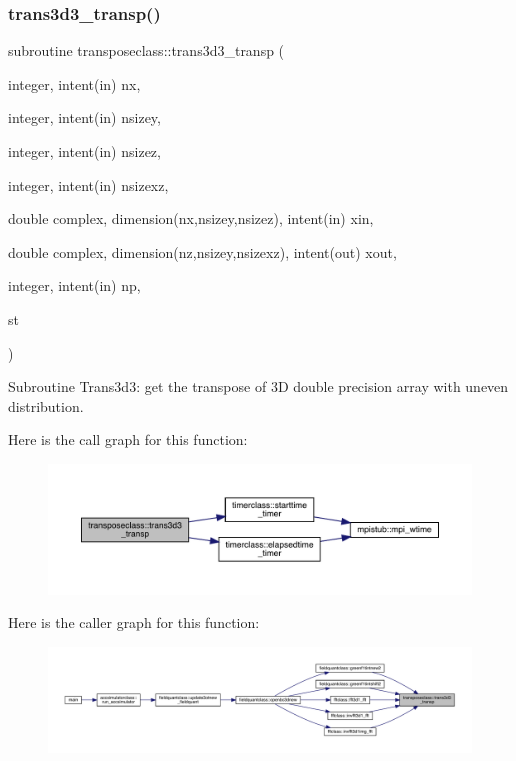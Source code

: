\subsubsection{\texorpdfstring{trans3d3\_transp()}{trans3d3\_transp()}}
{\footnotesize\ttfamily subroutine transposeclass\+::trans3d3\+\_\+transp (\begin{DoxyParamCaption}\item[{integer, intent(in)}]{nx,  }\item[{integer, intent(in)}]{nsizey,  }\item[{integer, intent(in)}]{nsizez,  }\item[{integer, intent(in)}]{nsizexz,  }\item[{double complex, dimension(nx,nsizey,nsizez), intent(in)}]{xin,  }\item[{double complex, dimension(nz,nsizey,nsizexz), intent(out)}]{xout,  }\item[{integer, intent(in)}]{np,  }\item[{}]{st }\end{DoxyParamCaption})}



Subroutine Trans3d3\+: get the transpose of 3D double precision array with uneven distribution. 

Here is the call graph for this function\+:
\nopagebreak
\begin{figure}[H]
\begin{center}
\leavevmode
\includegraphics[width=350pt]{namespacetransposeclass_ac2cdff8d4fbeb19df8a8ba2ff562b8c2_cgraph}
\end{center}
\end{figure}
Here is the caller graph for this function\+:
\nopagebreak
\begin{figure}[H]
\begin{center}
\leavevmode
\includegraphics[width=350pt]{namespacetransposeclass_ac2cdff8d4fbeb19df8a8ba2ff562b8c2_icgraph}
\end{center}
\end{figure}
\mbox{\label{namespacetransposeclass_a53eeae5e11acd8c39e03fb8672f2d90e}} 
